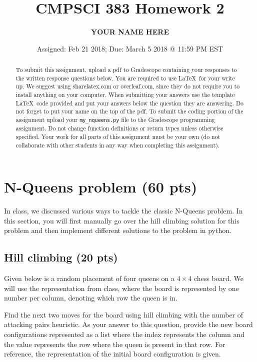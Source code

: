 \documentclass{article}
\title{CMPSCI 383 Homework 2}
\author{\textbf{YOUR NAME HERE}}
\date{Assigned: Feb 21 2018; Due: March 5 2018 @ 11:59 PM EST}
\begin{document}
\maketitle

\begin{abstract}
    To submit this assignment, upload a pdf to Gradescope containing your responses to the written response questions below. You are required to use \LaTeX~for your write up. We suggest using sharelatex.com or overleaf.com, since they do not require you to install anything on your computer. When submitting your answers use the template \LaTeX~code provided and put your answers below the question they are answering. Do not forget to put your name on the top of the pdf. To submit the coding portion of the assignment upload your \texttt{my\_nqueens.py} file to the Gradescope programming assignment. Do not change function definitions or return types unless otherwise specified. Your work for all parts of this assignment must be your own (do not collaborate with other students in any way when completing this assignment). 
\end{abstract}

\section{N-Queens problem (60 pts)}
In class, we discussed various ways to tackle the classic N-Queens problem. In this section, you will first manually go over the hill climbing solution for this problem and then implement different solutions to the problem in python. 

\subsection{Hill climbing (20 pts)}
Given below is a random placement of four queens on a $4\times 4$ chess board. We will use the representation from class, where the board is represented by one number per column, denoting which row the queen is in. 

Find the next two moves for the board using hill climbing with the number of attacking pairs heuristic. As your answer to this question, provide the new board configurations represented as a list where the index represents the column and the value represents the row where the queen is present in that row. For reference, the representation of the initial board configuration is given.
\end{document}
